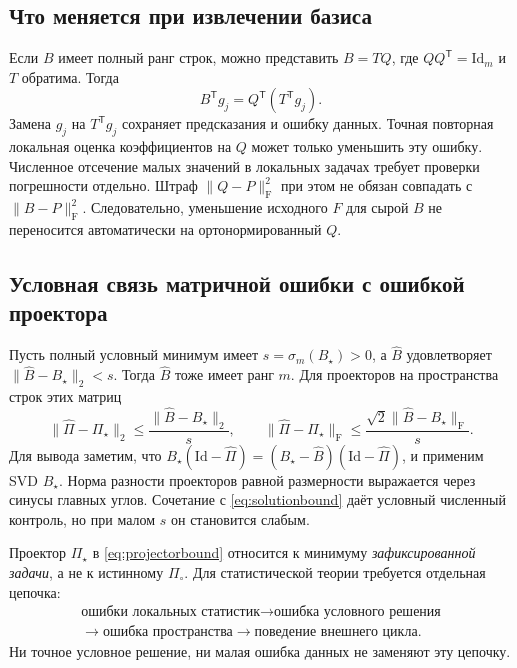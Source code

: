 \documentclass[11pt,a4paper]{article}
\numberwithin{equation}{section}
\theoremstyle{remark}
\newcommand{\Id}{\mathrm{Id}}
\newcommand{\T}{^{\mathsf T}}
\newcommand{\F}{_{\mathrm F}}
\begin{document}
\subsection{Что меняется при извлечении базиса}
Если $B$ имеет полный ранг строк, можно представить $B=TQ$,
где $Q Q\T=\Id_m$ и $T$ обратима. Тогда
\begin{equation}\label{eq:coeftransform}
 B\T g_j=Q\T(T\T g_j).
\end{equation}
Замена $g_j$ на $T\T g_j$ сохраняет предсказания и ошибку данных.
Точная повторная локальная оценка коэффициентов на $Q$ может только уменьшить
эту ошибку. Численное отсечение малых значений в локальных задачах требует
проверки погрешности отдельно.
Штраф $\|Q-P\|\F^2$ при этом не обязан совпадать с $\|B-P\|\F^2$.
Следовательно, уменьшение исходного $F$ для сырой $B$ не переносится
автоматически на ортонормированный $Q$.

\subsection{Условная связь матричной ошибки с ошибкой проектора}
Пусть полный условный минимум имеет
$s=\sigma_m(B_\star)>0$, а $\widehat B$ удовлетворяет
$\|\widehat B-B_\star\|_2<s$. Тогда $\widehat B$ тоже имеет ранг $m$.
Для проекторов на пространства строк этих матриц
\begin{equation}\label{eq:projectorbound}
 \|\widehat\Pi-\Pi_\star\|_2
 \le\frac{\|\widehat B-B_\star\|_2}{s},
 \qquad
 \|\widehat\Pi-\Pi_\star\|\F
 \le\frac{\sqrt2\|\widehat B-B_\star\|\F}{s}.
\end{equation}
Для вывода заметим, что
$B_\star(\Id-\widehat\Pi)
=(B_\star-\widehat B)(\Id-\widehat\Pi)$, и применим SVD $B_\star$.
Норма разности проекторов равной размерности выражается через синусы
главных углов. Сочетание с \eqref{eq:solutionbound} даёт условный численный
контроль, но при малом $s$ он становится слабым.

Проектор $\Pi_\star$ в \eqref{eq:projectorbound} относится к минимуму
\emph{зафиксированной задачи}, а не к истинному $\Pi_\circ$.
Для статистической теории требуется отдельная цепочка:
\[
 \begin{gathered}
 \text{ошибки локальных статистик}
 \longrightarrow\text{ошибка условного решения}\\
 \longrightarrow\text{ошибка пространства}
 \longrightarrow\text{поведение внешнего цикла}.
 \end{gathered}
\]
Ни точное условное решение, ни малая ошибка данных не заменяют эту цепочку.
\end{document}
